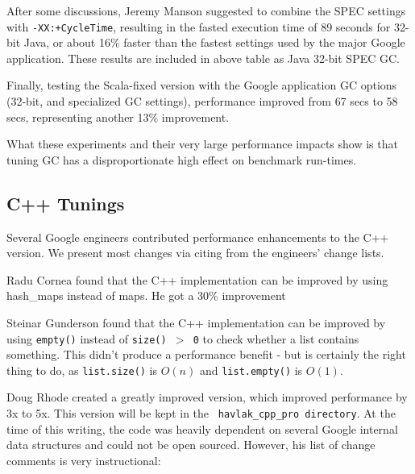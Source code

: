 After some discussions, Jeremy Manson suggested to combine the SPEC
settings with {\tt -XX:+CycleTime}, resulting in the fasted execution
time of 89 seconds for 32-bit Java, or about 16\% faster than the
fastest settings used by the major Google application. These results
are included in above table as Java 32-bit SPEC GC.

Finally, testing the Scala-fixed version with the Google application
GC options (32-bit, and specialized GC settings), performance improved
from 67 secs to 58 secs, representing another 13\% improvement.

What these experiments and their very large performance
impacts show is that tuning GC has a disproportionate high
effect on benchmark run-times.


\subsection{C++ Tunings}

Several Google engineers contributed performance enhancements to
the C++ version. We present most changes via citing from the
engineers' change lists.

Radu Cornea found that the C++ implementation can be improved by using
hash\_maps instead of maps. He got a 30\% improvement

Steinar Gunderson found that the C++ implementation can be improved by
using {\tt empty()} instead of {\tt size() $>$ 0} to check whether a list
contains something. This didn't produce a performance benefit - but is
certainly the right thing to do, as {\tt list.size()} is $O(n)$ and
{\tt list.empty()} is $O(1)$.

Doug Rhode created a greatly improved version, which improved
performance by 3x to 5x. This version will be kept in the {\tt
  havlak\_cpp\_pro directory}. At the time
of this writing, the code was heavily dependent on several
Google internal data structures and could not be open sourced. However, his list of change comments is very instructional:

